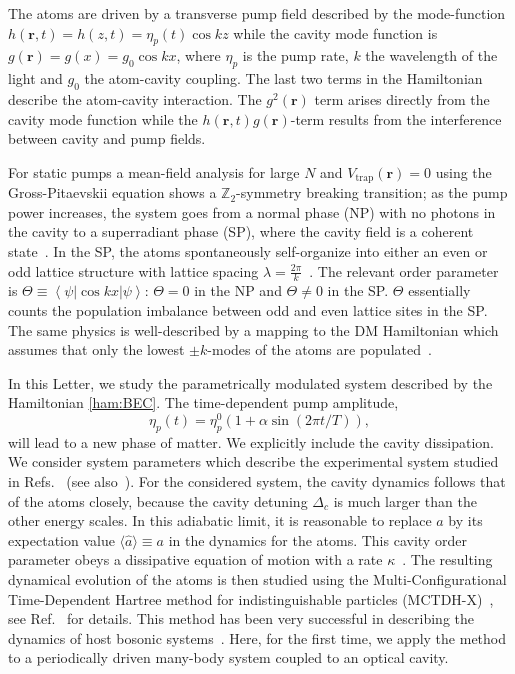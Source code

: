\documentclass[aps,prl,twocolumn,superscriptaddress,groupedaddress]{revtex4}  %
\newcommand{\ket}[1]{\left| #1 \right>} %
\newcommand{\bra}[1]{\left< #1 \right|} %
\begin{document}
The atoms are driven by a transverse pump field described by the mode-function $h(\mathbf{r}, t) = h(z, t) = \eta_p (t) \cos k z$ while the cavity mode function is 
$g(\mathbf{r}) = g(x) = g_0 \cos k x$, where $\eta_p$ is the pump rate, $k$ the wavelength of the light and $g_0$ the atom-cavity coupling.
The last two terms in the Hamiltonian describe the atom-cavity interaction. The $g^2(\mathbf{r})$ term arises directly from the cavity mode function while the 
$h(\mathbf{r}, t) g(\mathbf{r})$-term results from the interference between cavity and pump fields. 

For static pumps a mean-field analysis for large $N$ and $V_{\textrm{trap}} (\mathbf{r}) = 0$ using the Gross-Pitaevskii equation 
shows a $\mathbb{Z}_2$-symmetry breaking transition; as the pump power increases, the system goes from a normal phase (NP) with no photons in the cavity to a superradiant phase (SP), 
where the cavity field is a coherent state~\cite{Nagy:2008, Baumann:2010, PRLNagy2010}. In the SP, the atoms spontaneously self-organize into either an even or odd lattice 
structure with lattice spacing $\lambda= \frac{2\pi}{k}$~\cite{Baumann:2010}. 
The relevant order parameter  is $\Theta \equiv \bra{\psi} \cos kx \ket{\psi}$:  $\Theta = 0$ in the NP and $\Theta \ne  0$ in the SP. $\Theta$  essentially  counts the population 
imbalance between odd and even  lattice sites in the  SP. The same physics is well-described by a mapping to the 
DM Hamiltonian which assumes that only the lowest $\pm k$-modes of the atoms are populated~\cite{PRLNagy2010,Baumann:2010}.


In this Letter, we study the parametrically modulated system described by the Hamiltonian \eqref{ham:BEC}.  
The time-dependent pump amplitude,
\begin{equation}
\eta_p(t) = \eta_p^0 \left( 1 + \alpha \sin \left( 2\pi t /T \right) \right), \label{eq:pump}
\end{equation}
will lead to a new phase of matter. We explicitly include the cavity dissipation.
We consider system parameters which describe the experimental system studied in Refs.~\cite{Baumann:2010, Baumann:2011} (see also~\cite{supmat}).
For the considered system, the cavity dynamics follows that of the atoms closely, because the cavity detuning $\Delta_c$ is much larger than the other energy scales. 
In this adiabatic limit, it is reasonable to replace $\hat{a}$ by its expectation value $\langle \hat{a} \rangle \equiv a$ in the dynamics for the atoms. 
This cavity order parameter obeys a dissipative equation of motion with a rate $\kappa$~\cite{supmat}. The resulting dynamical evolution of the atoms is then 
studied using the Multi-Configurational Time-Dependent Hartree method for indistinguishable particles (MCTDH-X)~\cite{ultracold, exact_F, SMCTDHB, MCTDHX}, 
see Ref.~\cite{supmat} for details. This method has been very successful in describing the dynamics of host bosonic 
systems~\cite{PRLAxel, MCTDHB_init, MCTDHB_PRL}. Here, for the first time, we apply the method to a periodically driven many-body system coupled to an 
optical cavity. 
\end{document}

